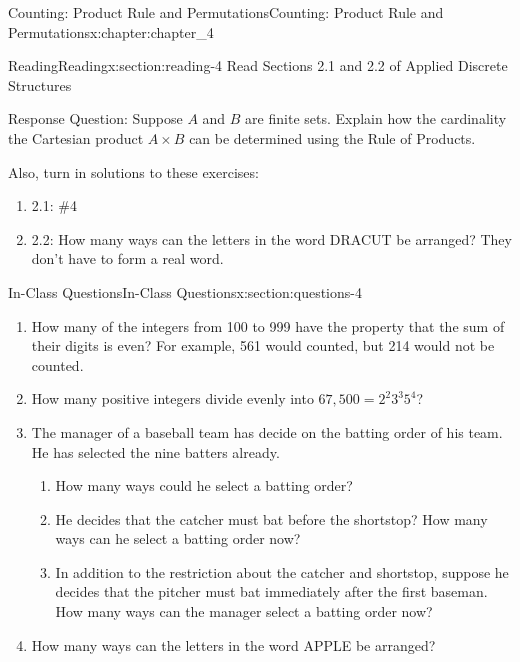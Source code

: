 \documentclass[oneside,10pt,]{book}
\numberwithin{equation}{section}
\begin{document}
\begin{chapterptx}{Counting: Product Rule and Permutations}{}{Counting: Product Rule and Permutations}{}{}{x:chapter:chapter_4}
\index{}%
%
%
\typeout{************************************************}
\typeout{************************************************}
%
\begin{sectionptx}{Reading}{}{Reading}{}{}{x:section:reading-4}
Read Sections 2.1 and 2.2 of Applied Discrete Structures%
\par
Response Question:  Suppose \(A\) and \(B\) are finite sets.  Explain how the cardinality the Cartesian product \(A \times B\) can be determined using the Rule of Products.%
\par
Also, turn in solutions to these exercises:%
\begin{enumerate}
\item{}2.1: \#4%
\item{}2.2: How many ways can the letters in the word DRACUT be arranged? They don't have to form a real word.%
\end{enumerate}
%
\end{sectionptx}
%
%
\typeout{************************************************}
\typeout{************************************************}
%
\begin{sectionptx}{In-Class Questions}{}{In-Class Questions}{}{}{x:section:questions-4}
%
\begin{enumerate}[label=\arabic*.]
\item{}How many of the integers from 100 to 999 have the property that the sum of their digits is even? For example, 561 would counted, but 214 would not be counted.%
\item{}How many positive integers divide evenly into \(67,500=2^2 3^3 5^4\)?%
\item{}The manager of a baseball team has decide on the batting order of his team.  He has selected the nine batters already.%
\begin{enumerate}[label=(\alph*)]
\item{}How many ways could he select a batting order?%
\item{}He decides that the catcher must bat before the shortstop?  How many ways can he select a batting order now?%
\item{}In addition to the restriction about the catcher and shortstop, suppose he decides that the pitcher must bat immediately after the first baseman.  How many ways can the manager select a batting order now?%
\end{enumerate}
%
\item{}How many ways can the letters in the word APPLE be arranged?%
\end{enumerate}
%
\end{sectionptx}
\end{chapterptx}
\end{document}
